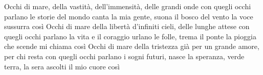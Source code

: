 \beginverse
Occhi di mare, della vastità,
dell'immensità, delle grandi onde
con quegli occhi parlano le storie del mondo
canta la mia gente, suona il bosco
del vento la voce sussurra così
Occhi di mare della libertà
d'infiniti cieli, delle lunghe attese
con quegli occhi parlano la vita e il coraggio
urlano le folle, trema il ponte
la pioggia che scende mi chiama così
Occhi di mare della tristezza
già per un grande amore, per chi resta
con quegli occhi parlano i sogni futuri,
nasce la speranza, verde terra,
la sera ascolti il mio cuore così
\endverse
\endsong
